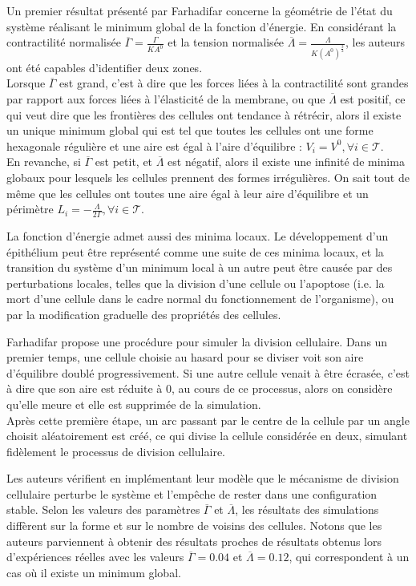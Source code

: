 \documentclass[11pt,a4paper]{article}
\begin{document}
Un premier résultat présenté par Farhadifar concerne la géométrie de l'état du système réalisant le minimum global de la fonction d'énergie. En considérant la contractilité normalisée $\overline{\Gamma} = \frac{\Gamma}{KA^0}$ et la tension normalisée $\overline{\Lambda} = \frac{\Lambda}{K(A^0)^{\frac{3}{2}}}$, les auteurs ont été capables d'identifier deux zones.\\ 
Lorsque $\overline{\Gamma}$ est grand, c'est à dire que les forces liées à la contractilité sont grandes par rapport aux forces liées à l'élasticité de la membrane, ou que $\overline{\Lambda}$ est positif, ce qui veut dire que les frontières des cellules ont tendance à rétrécir, alors il existe un unique minimum global qui est tel que toutes les cellules ont une forme hexagonale régulière et une aire est égal à l'aire d'équilibre : $V_i = V^0, \forall i \in \mathcal{T}$. \\
En revanche, si $\overline{\Gamma}$ est petit, et $\overline{\Lambda}$ est négatif, alors il existe une infinité de minima globaux pour lesquels les cellules prennent des formes irrégulières. On sait tout de même que les cellules ont toutes une aire égal à leur aire d'équilibre et un périmètre $L_i = -\frac{\Lambda}{2\Gamma}, \forall i \in \mathcal{T}$. 

La fonction d'énergie admet aussi des minima locaux. Le développement d'un épithélium peut être représenté comme une suite de ces minima locaux, et la transition du système d'un minimum local à un autre peut être causée par des perturbations locales, telles que la division d'une cellule ou l'apoptose (i.e. la mort d'une cellule dans le cadre normal du fonctionnement de l'organisme), ou par la modification graduelle des propriétés des cellules.

Farhadifar propose une procédure pour simuler la division cellulaire. Dans un premier temps, une cellule choisie au hasard pour se diviser voit son aire d'équilibre doublé progressivement. Si une autre cellule venait à être écrasée, c'est à dire que son aire est réduite à 0, au cours de ce processus, alors on considère qu'elle meure et elle est supprimée de la simulation. \\
Après cette première étape, un arc passant par le centre de la cellule par un angle choisit aléatoirement est créé, ce qui divise la cellule considérée en deux, simulant fidèlement le processus de division cellulaire.

Les auteurs vérifient en implémentant leur modèle que le mécanisme de division cellulaire perturbe le système et l'empêche de rester dans une configuration stable. Selon les valeurs des paramètres $\overline{\Gamma}$ et $\overline{\Lambda}$, les résultats des simulations diffèrent sur la forme et sur le nombre de voisins des cellules. Notons que les auteurs parviennent à obtenir des résultats proches de résultats obtenus lors d'expériences réelles avec les valeurs $\overline{\Gamma}=0.04$ et $\overline{\Lambda}=0.12$, qui correspondent à un cas où il existe un minimum global.
\end{document}
